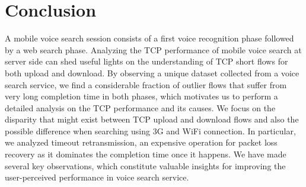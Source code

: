 
\section{Conclusion}
\label{sec:conclude}


A mobile voice search session consists of a first voice recognition phase followed by a web search phase. Analyzing the TCP performance of mobile voice search at server side can shed useful lights on the understanding of TCP short flows for both upload and download. By observing a unique dataset collected from a voice search service, we find a considerable fraction of outlier flows that suffer from very long completion time in both phases, which motivates us to perform a detailed analysis on the TCP performance and its causes. We focus on the disparity that might exist between TCP upload and download flows and also the possible difference when searching using 3G and WiFi connection. In particular, we analyzed timeout retransmission, an expensive operation for packet loss recovery as it dominates the completion time once it happens. We have made several key observations, which constitute valuable insights for improving the user-perceived performance in voice search service.
